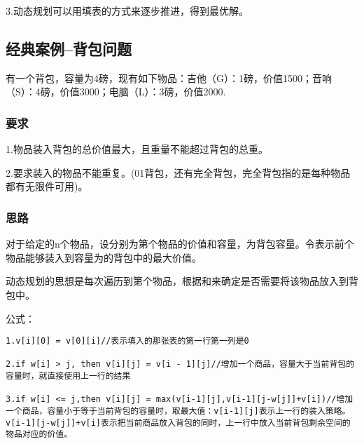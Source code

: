 \documentclass[a4paper]{report}
\begin{document}
3.动态规划可以用填表的方式来逐步推进，得到最优解。
\subsection{经典案例--背包问题}
有一个背包，容量为4磅，现有如下物品：吉他（G）：1磅，价值1500；音响（S）：4磅，价值3000；电脑（L）：3磅，价值2000.

\subsubsection{要求}

1.物品装入背包的总价值最大，且重量不能超过背包的总重。

2.要求装入的物品不能重复。(01背包，还有完全背包，完全背包指的是每种物品都有无限件可用)。

\subsubsection{思路}
对于给定的n个物品，设分别为第个物品的价值和容量，为背包容量。令表示前个物品能够装入到容量为的背包中的最大价值。

动态规划的思想是每次遍历到第个物品，根据和来确定是否需要将该物品放入到背包中。

公式：
\begin{lstlisting}
1.v[i][0] = v[0][i]//表示填入的那张表的第一行第一列是0

2.if w[i] > j, then v[i][j] = v[i - 1][j]//增加一个商品，容量大于当前背包的容量时，就直接使用上一行的结果

3.if w[i] <= j,then v[i][j] = max(v[i-1][j],v[i-1][j-w[j]]+v[i])//增加一个商品，容量小于等于当前背包的容量时，取最大值：v[i-1][j]表示上一行的装入策略。v[i-1][j-w[j]]+v[i]表示把当前商品放入背包的同时，上一行中放入当前背包剩余空间的物品对应的价值。
\end{lstlisting}
\end{document}
